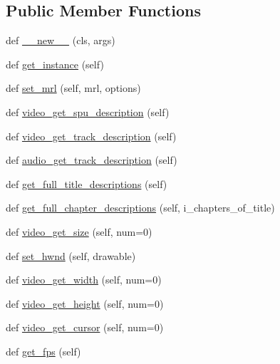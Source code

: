 \subsection*{Public Member Functions}
\begin{DoxyCompactItemize}
\item 
def \hyperlink{classvlc_1_1_media_player_acc2aa3fac6a63e8bac4f19efc327102b}{\+\_\+\+\_\+new\+\_\+\+\_\+} (cls, args)
\item 
def \hyperlink{classvlc_1_1_media_player_a56c15bafa43c856366863fc07fc4021f}{get\+\_\+instance} (self)
\item 
def \hyperlink{classvlc_1_1_media_player_a2c4747c725843bd4ab289d7288838369}{set\+\_\+mrl} (self, mrl, options)
\item 
def \hyperlink{classvlc_1_1_media_player_a80f66276b0f1860d19dd5d771e7db936}{video\+\_\+get\+\_\+spu\+\_\+description} (self)
\item 
def \hyperlink{classvlc_1_1_media_player_a93127aa157b1e8d516c2a2dd8c77db21}{video\+\_\+get\+\_\+track\+\_\+description} (self)
\item 
def \hyperlink{classvlc_1_1_media_player_a667cc2166e0219c59571ea3b314babb9}{audio\+\_\+get\+\_\+track\+\_\+description} (self)
\item 
def \hyperlink{classvlc_1_1_media_player_a13b7b90ec73fb26fadf694e95c06659e}{get\+\_\+full\+\_\+title\+\_\+descriptions} (self)
\item 
def \hyperlink{classvlc_1_1_media_player_a8c7d9546a94507e0046488e6159d8ffc}{get\+\_\+full\+\_\+chapter\+\_\+descriptions} (self, i\+\_\+chapters\+\_\+of\+\_\+title)
\item 
def \hyperlink{classvlc_1_1_media_player_a510a2f0ec76549207198544715c65783}{video\+\_\+get\+\_\+size} (self, num=0)
\item 
def \hyperlink{classvlc_1_1_media_player_aee1140a71ab519fb1b1d4641272298fe}{set\+\_\+hwnd} (self, drawable)
\item 
def \hyperlink{classvlc_1_1_media_player_a48602f969d067204addde054bf19ac2a}{video\+\_\+get\+\_\+width} (self, num=0)
\item 
def \hyperlink{classvlc_1_1_media_player_a282ff18f2701edbdab0cb4638f9439ea}{video\+\_\+get\+\_\+height} (self, num=0)
\item 
def \hyperlink{classvlc_1_1_media_player_ab7dafcaa92a52013fbd88fd5d8d45588}{video\+\_\+get\+\_\+cursor} (self, num=0)
\item 
def \hyperlink{classvlc_1_1_media_player_a823cac8c86fef8482ec276c7988e0154}{get\+\_\+fps} (self)
\item 

\end{DoxyCompactItemize}
